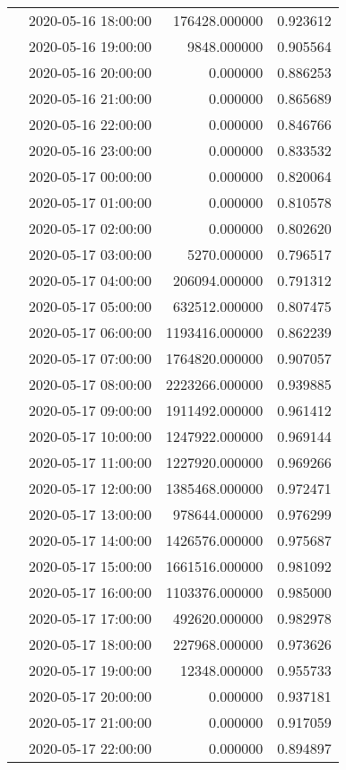 \begin{tabular}{llrr}
 & 2020-05-16 18:00:00 & 176428.000000 & 0.923612 \\
 & 2020-05-16 19:00:00 & 9848.000000 & 0.905564 \\
 & 2020-05-16 20:00:00 & 0.000000 & 0.886253 \\
 & 2020-05-16 21:00:00 & 0.000000 & 0.865689 \\
 & 2020-05-16 22:00:00 & 0.000000 & 0.846766 \\
 & 2020-05-16 23:00:00 & 0.000000 & 0.833532 \\
 & 2020-05-17 00:00:00 & 0.000000 & 0.820064 \\
 & 2020-05-17 01:00:00 & 0.000000 & 0.810578 \\
 & 2020-05-17 02:00:00 & 0.000000 & 0.802620 \\
 & 2020-05-17 03:00:00 & 5270.000000 & 0.796517 \\
 & 2020-05-17 04:00:00 & 206094.000000 & 0.791312 \\
 & 2020-05-17 05:00:00 & 632512.000000 & 0.807475 \\
 & 2020-05-17 06:00:00 & 1193416.000000 & 0.862239 \\
 & 2020-05-17 07:00:00 & 1764820.000000 & 0.907057 \\
 & 2020-05-17 08:00:00 & 2223266.000000 & 0.939885 \\
 & 2020-05-17 09:00:00 & 1911492.000000 & 0.961412 \\
 & 2020-05-17 10:00:00 & 1247922.000000 & 0.969144 \\
 & 2020-05-17 11:00:00 & 1227920.000000 & 0.969266 \\
 & 2020-05-17 12:00:00 & 1385468.000000 & 0.972471 \\
 & 2020-05-17 13:00:00 & 978644.000000 & 0.976299 \\
 & 2020-05-17 14:00:00 & 1426576.000000 & 0.975687 \\
 & 2020-05-17 15:00:00 & 1661516.000000 & 0.981092 \\
 & 2020-05-17 16:00:00 & 1103376.000000 & 0.985000 \\
 & 2020-05-17 17:00:00 & 492620.000000 & 0.982978 \\
 & 2020-05-17 18:00:00 & 227968.000000 & 0.973626 \\
 & 2020-05-17 19:00:00 & 12348.000000 & 0.955733 \\
 & 2020-05-17 20:00:00 & 0.000000 & 0.937181 \\
 & 2020-05-17 21:00:00 & 0.000000 & 0.917059 \\
 & 2020-05-17 22:00:00 & 0.000000 & 0.894897 \\

\end{tabular}
